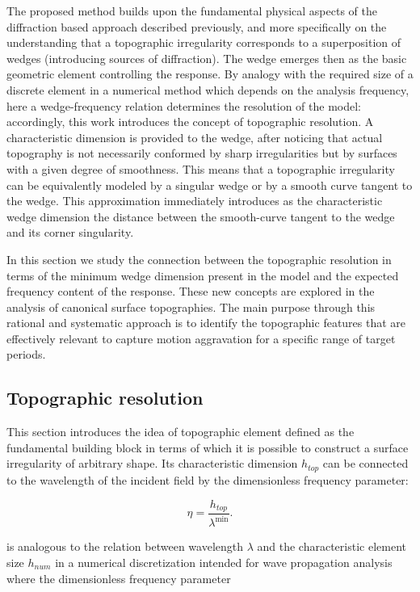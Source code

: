 \documentclass[11pt,letterpaper]{article}
\begin{document}
The proposed method builds upon the fundamental  physical aspects of the diffraction based approach described previously, and more specifically on the understanding that a topographic irregularity corresponds to a superposition of wedges (introducing sources of diffraction). The wedge emerges then as the basic geometric element controlling the response. By analogy with the required size of a discrete element in a numerical method which depends on the analysis frequency, here a wedge-frequency relation determines the resolution of the model: accordingly, this work introduces the concept of topographic resolution. A characteristic dimension is provided to the wedge, after noticing that actual topography is not necessarily conformed by sharp irregularities but by surfaces with a given degree of smoothness. This means that a topographic irregularity can be equivalently modeled by a singular wedge or by a smooth curve tangent to the wedge. This approximation immediately introduces as the characteristic wedge dimension the distance between the smooth-curve tangent to the wedge and its corner singularity. 


In this section we study the connection between the topographic resolution in terms of the minimum wedge dimension present in the model and the expected frequency content of the response. These new concepts are explored in the analysis of canonical surface topographies. The main purpose through this rational and systematic approach is to identify the topographic features that are effectively relevant to capture motion aggravation for a specific range of target periods. 

\subsection*{Topographic resolution}
This section introduces the idea of topographic element defined as the fundamental building block in terms of which it is possible to construct a surface irregularity of arbitrary shape. Its characteristic dimension $h_{top}$ can be connected to the wavelength of the incident field by the dimensionless frequency parameter:

\begin{equation}
\eta  = \frac{{{h_{top}}}}{{{\lambda ^{\min }}}}.
\label{Eq:topogra}
\end{equation}

 is analogous to the relation between wavelength $\lambda$ and the characteristic element size $h_{num}$ in a numerical discretization intended for wave propagation analysis where the dimensionless frequency parameter
\end{document}
